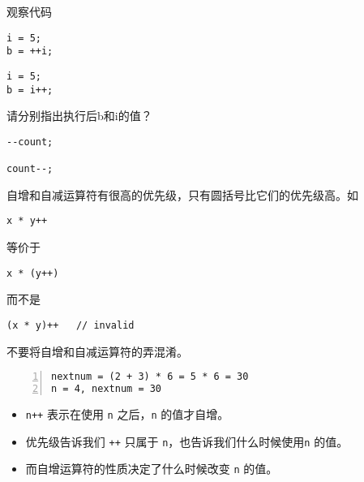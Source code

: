 \begin{frame}[fragile]
观察代码
\begin{lstlisting}
i = 5;
b = ++i;
\end{lstlisting}
\begin{lstlisting}
i = 5;
b = i++;
\end{lstlisting}
请分别指出执行后b和i的值？
\end{frame}

\begin{frame}[fragile]
\begin{lstlisting}
--count; 

count--; 
\end{lstlisting}
\end{frame}

\begin{frame}[fragile]
自增和自减运算符有很高的优先级，只有圆括号比它们的优先级高。如
\begin{lstlisting}[backgroundcolor=\color{red!10},frame=no]
x * y++
\end{lstlisting}
等价于
\begin{lstlisting}[backgroundcolor=\color{red!10},frame=no]
x * (y++)
\end{lstlisting}
而不是
\begin{lstlisting}
(x * y)++   // invalid
\end{lstlisting}
\end{frame}

\begin{frame}[fragile]
不要将自增和自减运算符的弄混淆。
\end{frame}

\begin{frame}[fragile]
  

\pause 
\begin{lstlisting}[frame=no,numbers=left]
nextnum = (2 + 3) * 6 = 5 * 6 = 30 
n = 4, nextnum = 30
\end{lstlisting}
\end{frame}

\begin{frame}[fragile]
\begin{itemize}
\item \lstinline|n++| 表示在使用 \lstinline|n| 之后，\lstinline|n| 的值才自增。\\[0.1in]
\item 优先级告诉我们 \lstinline|++| 只属于 \lstinline|n|，也告诉我们什么时候使用\lstinline|n| 的值。\\[0.1in]
\item 而自增运算符的性质决定了什么时候改变 \lstinline|n| 的值。
\end{itemize}
\end{frame}


